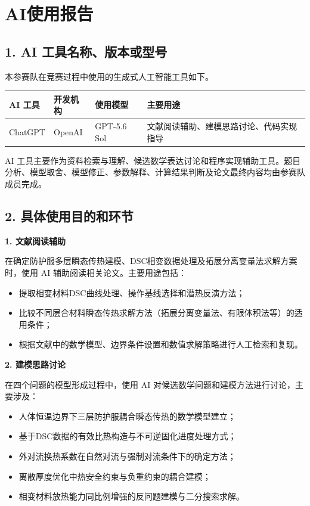 \section*{AI使用报告}

\subsection*{1. AI 工具名称、版本或型号}

本参赛队在竞赛过程中使用的生成式人工智能工具如下。

\begin{center}
\begin{tabularx}{0.92\textwidth}{>{\centering\arraybackslash}p{2.6cm}>{\centering\arraybackslash}p{2.6cm}>{\centering\arraybackslash}p{3.0cm}X}
\toprule
\textbf{AI 工具} & \textbf{开发机构} & \textbf{使用模型} & \textbf{主要用途}\\
\midrule
ChatGPT & OpenAI & GPT-5.6 Sol & 文献阅读辅助、建模思路讨论、代码实现指导\\
\bottomrule
\end{tabularx}
\end{center}

AI 工具主要作为资料检索与理解、候选数学表达讨论和程序实现辅助工具。题目分析、模型取舍、模型修正、参数解释、计算结果判断及论文最终内容均由参赛队成员完成。

\subsection*{2. 具体使用目的和环节}

\noindent\textbf{1. 文献阅读辅助}\par
在确定防护服多层瞬态传热建模、DSC相变数据处理及拓展分离变量法求解方案时，使用 AI 辅助阅读相关论文。主要用途包括：
\begin{itemize}
  \item 提取相变材料DSC曲线处理、操作基线选择和潜热反演方法；
  \item 比较不同层合材料瞬态传热求解方法（拓展分离变量法、有限体积法等）的适用条件；
  \item 根据文献中的数学模型、边界条件设置和数值求解策略进行人工检索和复现。
\end{itemize}

\noindent\textbf{2. 建模思路讨论}\par
在四个问题的模型形成过程中，使用 AI 对候选数学问题和建模方法进行讨论，主要涉及：
\begin{itemize}
  \item 人体恒温边界下三层防护服耦合瞬态传热的数学模型建立；
  \item 基于DSC数据的有效比热构造与不可逆固化进度处理方式；
  \item 外对流换热系数在自然对流与强制对流条件下的确定方法；
  \item 离散厚度优化中热安全约束与负重约束的耦合建模；
  \item 相变材料放热能力同比例增强的反问题建模与二分搜索求解。
\end{itemize}

